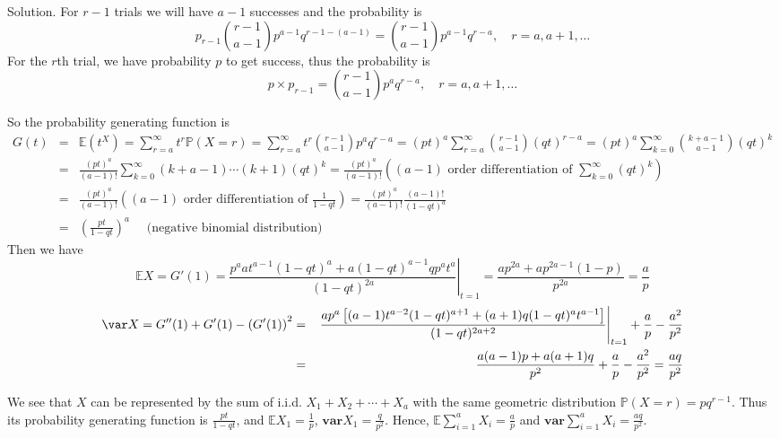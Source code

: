 Solution. For $r-1$ trials we will have $a-1$ successes and the probability is 
\begin{equation}
p_{r-1}\binom{r-1}{a-1}p^{a-1}q^{r-1-(a-1)} = \binom{r-1}{a-1}p^{a-1}q^{r-a}, \quad r=a,a+1,\dots
\end{equation}
For the $r$th trial, we have probability $p$ to get success, thus the probability is 
\begin{equation}
p\times p_{r-1} = \binom{r-1}{a-1}p^{a}q^{r-a}, \quad r=a,a+1,\dots
\end{equation}

So the probability generating function is 
\begin{eqnarray}
G(t) & = & \mathbb{E}\left(t^X\right) = \sum^\infty_{r=a}t^r\mathbb{P}(X=r) = \sum^\infty_{r=a}t^r\binom{r-1}{a-1}p^{a}q^{r-a} = (pt)^a \sum^\infty_{r=a}\binom{r-1}{a-1}(qt)^{r-a} = (pt)^a \sum^\infty_{k=0}\binom{k+a-1}{a-1}(qt)^k  \nonumber\\
& = & \frac{(pt)^a}{(a-1)!} \sum^\infty_{k=0}(k+a-1)\cdots(k+1)(qt)^k = \frac{(pt)^a}{(a-1)!} \left(\text{$(a-1)$ order differentiation of }\sum^\infty_{k=0}(qt)^k\right) \nonumber\\
& = & \frac{(pt)^a}{(a-1)!} \left(\text{$(a-1)$ order differentiation of }\frac{1}{1-qt}\right) = \frac{(pt)^a}{(a-1)!} \frac{(a-1)!}{(1-qt)^a} \nonumber\\
& = & \left(\frac{pt}{1-qt}\right)^a \quad\text{ (negative binomial distribution)}
\end{eqnarray}
Then we have 
\begin{equation}
\mathbb{E}X = G'(1) = \left.\frac{p^aat^{a-1}(1-qt)^a + a(1-qt)^{a-1}qp^at^a}{(1-qt)^{2a}}\right|_{t=1} = \frac{ap^{2a} + ap^{2a-1}(1-p)}{p^{2a}} = \frac ap
\end{equation}
\begin{eqnarray}
\var X = G''(1)+G'(1)-\left(G'(1)\right)^2 & = & \left.\frac{ap^a\left[(a-1)t^{a-2}(1-qt)^{a+1} + (a+1)q(1-qt)^a t^{a-1}\right]}{(1-qt)^{2a+2}}\right|_{t=1} + \frac ap- \frac{a^2}{p^2} \nonumber\\
& = & \frac{a(a-1)p + a(a+1)q}{p^2}+ \frac ap- \frac{a^2}{p^2} = \frac{aq}{p^2}
\end{eqnarray}

We see that $X$ can be represented by the sum of i.i.d. $X_1+X_2+\cdots+X_a$ with the same geometric distribution $\mathbb{P}(X=r)=pq^{r-1}$. Thus its probability generating function is $\frac{pt}{1-qt}$, and $\mathbb{E}X_1=\frac 1p$, $\mathbf{var}X_1=\frac{q}{p^2}$. Hence, $\mathbb{E}\sum^a_{i=1}X_i=\frac{a}{p}$ and $\mathbf{var}\sum^a_{i=1}X_i=\frac{aq}{p^2}$.



